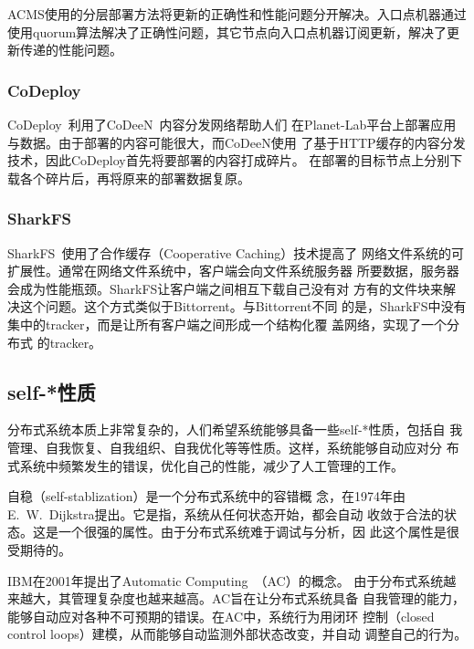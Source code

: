 ACMS使用的分层部署方法将更新的正确性和性能问题分开解决。入口点机器通过
使用quorum算法解决了正确性问题，其它节点向入口点机器订阅更新，解决了更
新传递的性能问题。

\subsubsection*{CoDeploy}

CoDeploy~\cite{codeploy}利用了CoDeeN~\cite{codeen}内容分发网络帮助人们
在Planet-Lab平台上部署应用与数据。由于部署的内容可能很大，而CoDeeN使用
了基于HTTP缓存的内容分发技术，因此CoDeploy首先将要部署的内容打成碎片。
在部署的目标节点上分别下载各个碎片后，再将原来的部署数据复原。

\subsubsection*{SharkFS}

SharkFS~\cite{sharkfs}使用了合作缓存（Cooperative Caching）技术提高了
网络文件系统的可扩展性。通常在网络文件系统中，客户端会向文件系统服务器
所要数据，服务器会成为性能瓶颈。SharkFS让客户端之间相互下载自己没有对
方有的文件块来解决这个问题。这个方式类似于Bittorrent。与Bittorrent不同
的是，SharkFS中没有集中的tracker，而是让所有客户端之间形成一个结构化覆
盖网络\cite{can, pastry, tapestry, chord, kademlia}，实现了一个分布式
的tracker。

\subsection{self-*性质}
\label{sec:related:selfstart}


分布式系统本质上非常复杂的，人们希望系统能够具备一些self-*性质，包括自
我管理、自我恢复、自我组织、自我优化等等性质。这样，系统能够自动应对分
布式系统中频繁发生的错误，优化自己的性能，减少了人工管理的工作。

自稳\cite{Dijkstra1974}（self-stablization）是一个分布式系统中的容错概
念，在1974年由E.\ W.\ Dijkstra提出。它是指，系统从任何状态开始，都会自动
收敛于合法的状态。这是一个很强的属性。由于分布式系统难于调试与分析，因
此这个属性是很受期待的。

IBM在2001年提出了Automatic Computing~\cite{Kephart2003}（AC）的概念。
由于分布式系统越来越大，其管理复杂度也越来越高。AC旨在让分布式系统具备
自我管理的能力，能够自动应对各种不可预期的错误。在AC中，系统行为用闭环
控制（closed control loops）建模，从而能够自动监测外部状态改变，并自动
调整自己的行为。

